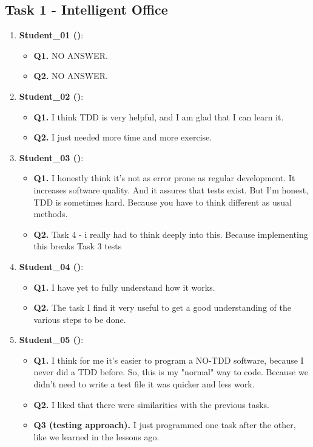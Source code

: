 \subsection{Task 1 - Intelligent Office}
\begin{enumerate}
    \item \textbf{Student\_01 (\tdd)}: 
    \begin{itemize}
        \item \textbf{Q1.} NO ANSWER.
        \item \textbf{Q2.} NO ANSWER.
    \end{itemize}

    \item \textbf{Student\_02 (\tdd)}: 
    \begin{itemize}
        \item \textbf{Q1.} I think TDD is very helpful, and I am glad that I can learn it.
        \item \textbf{Q2.} I just needed more time and more exercise.
    \end{itemize}

    \item \textbf{Student\_03 (\tdd)}: 
    \begin{itemize}
        \item \textbf{Q1.} I honestly think it’s not as error prone as regular development. It increases software quality. And it assures that tests exist. But I’m honest, TDD is sometimes hard. Because you have to think different as usual methods.
        \item \textbf{Q2.} Task 4 - i really had to think deeply into this. Because implementing this breaks Task 3 tests
    \end{itemize}

    \item \textbf{Student\_04 (\tdd)}: 
    \begin{itemize}
        \item \textbf{Q1.} I have yet to fully understand how it works.
        \item \textbf{Q2.} The task I find it very useful to get a good understanding of the various steps to be done.
    \end{itemize}

    \item \textbf{Student\_05 (\notdd)}: 
    \begin{itemize}
        \item \textbf{Q1.} I think for me it’s easier to program a NO-TDD software, because I never did a TDD before. So, this is my "normal" way to code. Because we didn't need to write a test file it was quicker and less work.
        \item \textbf{Q2.} I liked that there were similarities with the previous tasks.
        \item \textbf{Q3 (\notdd testing approach).} I just programmed one task after the other, like we learned in the lessons ago. 
    \end{itemize}


\end{enumerate}
